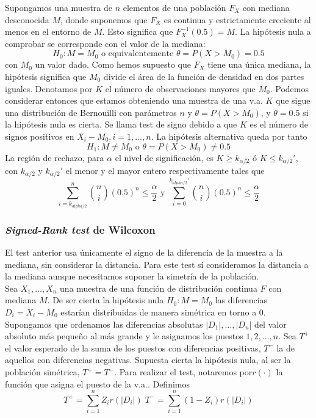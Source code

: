 	Supongamos una muestra de $n$ elementos de una población $F_X$ con mediana desconocida $M$, donde suponemos que $F_X$ es continua y estrictamente creciente al menos en el entorno de $M$. Esto significa que $F_X^{-1}(0.5) = M$. La hipótesis nula a comprobar se corresponde con el valor de la mediana:
	\[ H_0: M = M_0	\text{ o equivalentemente }
			\theta = P(X > M_0) = 0.5 \]
	con $M_0$ un valor dado. Como hemos supuesto que $F_X$ tiene una única mediana, la hipótesis significa que $M_0$ divide el área de la función de densidad en dos partes iguales. Denotamos por $K$ el número de observaciones mayores que $M_0$. Podemos considerar entonces que estamos obteniendo una muestra de una v.a. $K$ que sigue una distribución de Bernouilli con parámetros $n$ y $\theta=P(X>M_0)$, y $\theta=0.5$ si la hipótesis nula es cierta. Se llama test de signo debido a que $K$ es el número de signos positivos en $X_i - M_0, i = 1, \dots, n$. La hipótesis alternativa queda por tanto
	\[ H_1: M \neq M_0	\text{ o }
			\theta = P(X > M_0) \neq 0.5 \]
	La región de rechazo, para $\alpha$ el nivel de significación, es $K \geq k_{\alpha/2}$ ó $K \leq k_{\alpha/2}'$, con $k_{\alpha/2}$ y $k_{\alpha/2}'$ el menor y el mayor entero respectivamente tales que
	\[ \sum\limits_{i=k_{alpha/2}}^n
			{n \choose i}(0.5)^n \leq \frac{\alpha}{2}
		\text{ y }
		\sum\limits_{i=0}^{k_{alpha/2}'}
			{n \choose i}(0.5)^n \leq \frac{\alpha}{2}
	\]

\subsubsection{\textit{Signed-Rank test} de Wilcoxon}

	El test anterior usa únicamente el signo de la diferencia de la muestra a la mediana, sin considerar la distancia. Para este test sí consideramos la distancia a la mediana aunque necesitamos suponer la simetría de la población. \\
	Sea $X_1, \dots, X_n$ una muestra de una función de distribución continua $F$ con mediana $M$. De ser cierta la hipótesis nula $H_0: M = M_0$ las diferencias $D_i = X_i - M_0$ estarían distribuidas de manera simétrica en torno a 0.\\
	Supongamos que ordenamos las diferencias absolutas $|D_1|, \dots, |D_n|$ del valor absoluto más pequeño al más grande y le asignamos los puestos $1, 2, \dots, n$. Sea $T^+$ el valor esperado de la suma de los puestos con diferencias positivas, $T^-$ la de aquellos con diferencias negativas. Supuesta cierta la hipótesis nula, al ser la población simétrica, $T^+ = T^-$. Para realizar el test, notaremos por$r(\cdot)$ la función que asigna el puesto de la v.a.. Definimos
	\[ T^+ = \sum\limits_{i=1}^n Z_i r(|D_i|) \;
	   T^- = \sum\limits_{i=1}^n (1-Z_i) r(|D_i|) \]
	   
